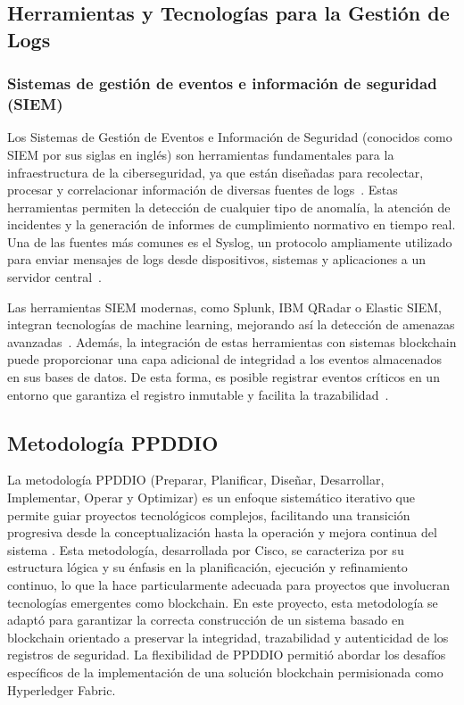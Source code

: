 \subsection{Herramientas y Tecnologías para la Gestión de Logs}
\subsubsection{Sistemas de gestión de eventos e información de seguridad (SIEM)}
Los Sistemas de Gestión de Eventos e Información de Seguridad (conocidos como SIEM por sus siglas en inglés) son herramientas fundamentales para la infraestructura de la ciberseguridad, ya que están diseñadas para recolectar, procesar y correlacionar información de diversas fuentes de logs~\cite{Bejtlich2013}. Estas herramientas permiten la detección de cualquier tipo de anomalía, la atención de incidentes y la generación de informes de cumplimiento normativo en tiempo real. Una de las fuentes más comunes es el Syslog, un protocolo ampliamente utilizado para enviar mensajes de logs desde dispositivos, sistemas y aplicaciones a un servidor central~\cite{Lonvick2001}.

Las herramientas SIEM modernas, como Splunk, IBM QRadar o Elastic SIEM, integran tecnologías de machine learning, mejorando así la detección de amenazas avanzadas~\cite{Chuvakin2013}. Además, la integración de estas herramientas con sistemas blockchain puede proporcionar una capa adicional de integridad a los eventos almacenados en sus bases de datos. De esta forma, es posible registrar eventos críticos en un entorno que garantiza el registro inmutable y facilita la trazabilidad~\cite{Ghaffari2021}.

\subsection{Metodología PPDDIO}
La metodología PPDDIO (Preparar, Planificar, Diseñar, Desarrollar, Implementar, Operar y Optimizar) es un enfoque sistemático iterativo que permite guiar proyectos tecnológicos complejos, facilitando una transición progresiva desde la conceptualización hasta la operación y mejora continua del sistema \cite{CiscoPPDIOO}. Esta metodología, desarrollada por Cisco, se caracteriza por su estructura lógica y su énfasis en la planificación, ejecución y refinamiento continuo, lo que la hace particularmente adecuada para proyectos que involucran tecnologías emergentes como blockchain. En este proyecto, esta metodología se adaptó para garantizar la correcta construcción de un sistema basado en blockchain orientado a preservar la integridad, trazabilidad y autenticidad de los registros de seguridad. La flexibilidad de PPDDIO permitió abordar los desafíos específicos de la implementación de una solución blockchain permisionada como Hyperledger Fabric.


